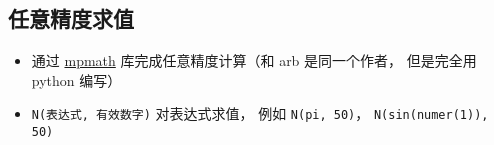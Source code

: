 \subsection{任意精度求值}
\begin{itemize}
\item 通过 \href{https://mpmath.org/}{mpmath} 库完成任意精度计算（和 arb 是同一个作者， 但是完全用 python 编写）
\item \verb|N(表达式, 有效数字)| 对表达式求值， 例如 \verb|N(pi, 50)|， \verb|N(sin(numer(1)), 50)|
\end{itemize}

